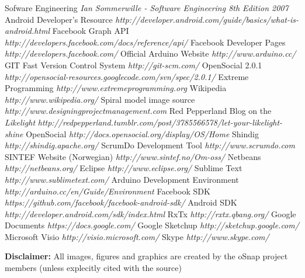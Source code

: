 \begin{thebibliography}{99}
 Sofware Engineering {\em Ian Sommerwille - Software Engineering 8th Edition 2007}
 Android Developer's Resource  {\em http://developer.android.com/guide/basics/what-is-android.html}
 Facebook Graph API {\em http://developers.facebook.com/docs/reference/api/}
 Facebook Developer Pages {\em http://developers.facebook.com/}
 Official Arduino Website {\em http://www.arduino.cc/}
 GIT Fast Version Control System {\em http://git-scm.com/}
 OpenSocial 2.0.1 {\em http://opensocial-resources.googlecode.com/svn/spec/2.0.1/}
 Extreme Programming {\em http://www.extremeprogramming.org}
 Wikipedia {\em http://www.wikipedia.org/ }
 Spiral model image source {\em http://www.designingprojectmanagement.com}
 Red Pepperland Blog on the \emph{Likelight} {\em http://redpepperland.tumblr.com/post/3785566578/let-your-likelight-shine}
 OpenSocial {\em http://docs.opensocial.org/display/OS/Home}
 Shindig {\em http://shindig.apache.org/}
 ScrumDo Development Tool {\em http://www.scrumdo.com}
 SINTEF Website (Norwegian) {\em http://www.sintef.no/Om-oss/}
 Netbeans {\em http://netbeans.org/}
 Eclipse {\em http://www.eclipse.org/}
 Sublime Text {\em http://www.sublimetext.com/}
 Arduino Development Environment {\em http://arduino.cc/en/Guide/Environment}
 Facebook SDK {\em https://github.com/facebook/facebook-android-sdk/}
 Android SDK {\em http://developer.android.com/sdk/index.html}
 RxTx {\em http://rxtx.qbang.org/}
 Google Documents {\em https://docs.google.com/}
 Google Sketchup {\em http://sketchup.google.com/}
 Microsoft Visio {\em http://visio.microsoft.com/}
 Skype {\em http://www.skype.com/}
\end{thebibliography}


\textbf{Disclaimer:}
All images, figures and graphics are created by the oSnap project members (unless explecitly cited with the source) 
